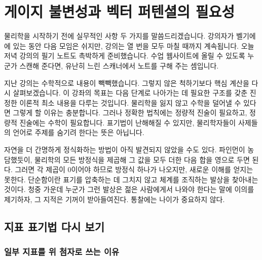 \chapter{게이지 불변성과 벡터 퍼텐셜의 필요성}

물리학을 시작하기 전에 실무적인 사항 두 가지를 말씀드리겠습니다. 강의자가 벨기에에 있는 동안 다음 모임은 쉬지만, 강의는 열 번을 모두 마칠 때까지 계속됩니다. 오늘 저녁 강의의 필기 노트도 촉박하게 준비했습니다. 수업 웹사이트에 올릴 수 있도록 누군가 스캔해 준다면, 유난히 느린 스캐너에서 노트를 구해 주는 셈입니다.

지난 강의는 수학적으로 내용이 빽빽했습니다. 그렇지 않은 척하기보다 핵심 계산을 다시 살펴보겠습니다. 이 강좌의 목표는 다음 단계로 나아가는 데 필요한 구조를 갖춘 진정한 이론적 최소 내용을 다루는 것입니다. 물리학을 잃지 않고 수학을 덜어낼 수 있다면 그렇게 할 이유는 충분합니다. 그러나 정확한 법칙에는 정량적 진술이 필요하고, 정량적 진술에는 수학이 필요합니다. 표기법이 난해해질 수 있지만, 물리학자들이 사제들의 언어로 주제를 숨기려 한다는 뜻은 아닙니다.

자연을 더 간명하게 정식화하는 방법이 아직 발견되지 않았을 수도 있다. 파인먼이 농담했듯이, 물리학의 모든 방정식을 제곱해 그 값을 모두 더한 다음 합을 영으로 두면 된다. 그러면 각 제곱이 0이어야 하므로 방정식 하나가 나오지만, 새로운 이해를 얻지는 못한다. 단순함이란 표기를 압축하는 데 그치지 않고 체계를 조직하는 발상을 찾아내는 것이다. 청중 가운데 누군가 그런 발상은 젊은 사람에게서 나와야 한다는 말에 이의를 제기하자, 그 지적은 기꺼이 받아들여진다. 통찰에는 나이가 중요하지 않다.


\section{지표 표기법 다시 보기}

\subsection{일부 지표를 위 첨자로 쓰는 이유}

